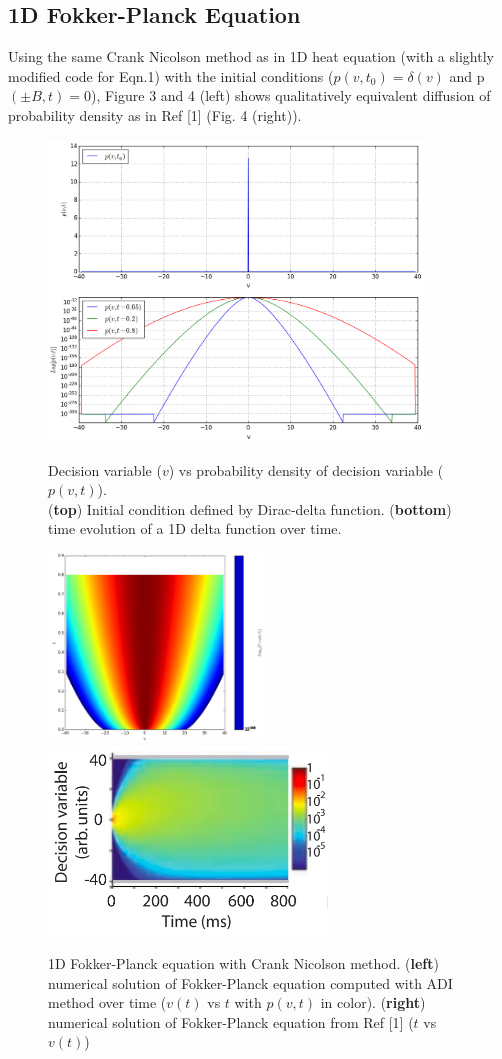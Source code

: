 \documentclass[12pt]{article}		%
\begin{document}
\subsection*{1D Fokker-Planck Equation}
Using the same Crank Nicolson method as in 1D heat equation (with a slightly modified code for Eqn.1) with the initial conditions ($p(v, t_0) = \delta (v)$ and p$(\pm B, t) = 0$), Figure 3 and 4 (left) shows qualitatively equivalent diffusion of probability density as in Ref [1] (Fig. 4 (right)). 
\begin{figure}[h]
\centering
\includegraphics[height=8cm]{figure-4-1d_planck.png}\par\medskip
\caption{Decision variable ($v$) vs probability density of decision variable ($p(v,t)$). 
\\ (\textbf{top}) Initial condition defined by Dirac-delta function. (\textbf{bottom}) time evolution of a 1D delta function over time.}
\includegraphics[height=5cm]{figure-5-1d_planck.png}\quad
\includegraphics[height=5cm]{figure_ref1.png}
\caption{1D Fokker-Planck equation with Crank Nicolson method. (\textbf{left}) numerical solution of Fokker-Planck equation computed with ADI method over time ($v(t)$ vs $t$ with $p(v,t)$ in color). (\textbf{right}) numerical solution of Fokker-Planck equation from Ref [1] ($t$ vs $v(t)$)}
\end{figure}
\end{document}
